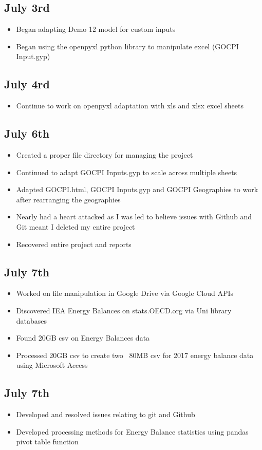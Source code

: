 \documentclass[12pt]{article}
\begin{document}
\subsection{July 3rd}
\begin{itemize}
	\item Began adapting Demo 12 model for custom inputs
	\item Began using the openpyxl python library to manipulate excel (GOCPI Input.gyp)
\end{itemize}
\subsection{July 4rd}
\begin{itemize}
	\item Continue to work on openpyxl adaptation with xls and xlsx excel sheets
\end{itemize}
\subsection{July 6th}
\begin{itemize}
	\item Created a proper file directory for managing the project
	\item Continued to adapt GOCPI Inputs.gyp to scale across multiple sheets
	\item Adapted GOCPI.html, GOCPI Inputs.gyp and GOCPI Geographies to work after rearranging the geographies
	\item Nearly had a heart attacked as I was led to believe issues with Github and Git meant I deleted my entire project
	\item Recovered entire project and reports
\end{itemize}
\subsection{July 7th}
\begin{itemize}
	\item Worked on file manipulation in Google Drive via Google Cloud APIs
	\item Discovered IEA Energy Balances on stats.OECD.org via Uni library databases
	\item Found 20GB csv on Energy Balances data
	\item Processed 20GB csv to create two ~80MB csv for 2017 energy balance data using Microsoft Access
\end{itemize}
\subsection{July 7th}
\begin{itemize}
	\item Developed and resolved issues relating to git and Github
	\item Developed processing methods for Energy Balance statistics using pandas pivot table function
\end{itemize}
\end{document}
